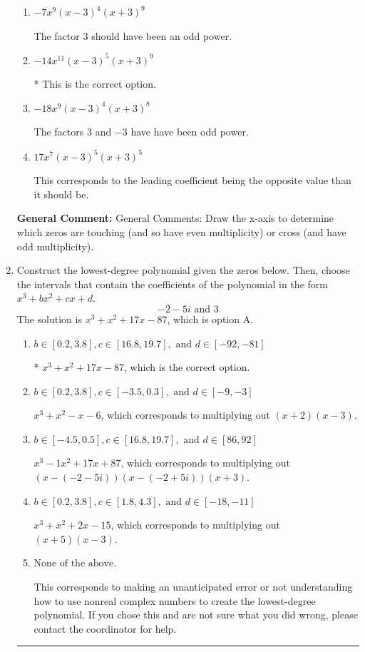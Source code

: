\documentclass{extbook}[14pt]
\newcommand{\litem}[1]{\item #1

\rule{\textwidth}{0.4pt}}
\begin{document}
\begin{enumerate}
{\begin{enumerate}[label=\Alph*.]
The factor $(x - 3)$ should have an odd power and the leading coefficient should be the opposite sign.
\item \( -7x^{9} (x - 3)^{4} (x + 3)^{9} \)

The factor $3$ should have been an odd power.
\item \( -14x^{11} (x - 3)^{5} (x + 3)^{9} \)

* This is the correct option.
\item \( -18x^{9} (x - 3)^{4} (x + 3)^{8} \)

The factors $3$ and $-3$ have have been odd power.
\item \( 17x^{7} (x - 3)^{5} (x + 3)^{5} \)

This corresponds to the leading coefficient being the opposite value than it should be.
\end{enumerate}

\textbf{General Comment:} General Comments: Draw the x-axis to determine which zeros are touching (and so have even multiplicity) or cross (and have odd multiplicity).
}
\litem{
Construct the lowest-degree polynomial given the zeros below. Then, choose the intervals that contain the coefficients of the polynomial in the form $x^3+bx^2+cx+d$.
\[ -2 - 5 i \text{ and } 3 \]The solution is \( x^{3} + x^{2} +17 x -87 \), which is option A.\begin{enumerate}[label=\Alph*.]
\item \( b \in [0.2, 3.8], c \in [16.8, 19.7], \text{ and } d \in [-92, -81] \)

* $x^{3} + x^{2} +17 x -87$, which is the correct option.
\item \( b \in [0.2, 3.8], c \in [-3.5, 0.3], \text{ and } d \in [-9, -3] \)

$x^{3} + x^{2} -x -6$, which corresponds to multiplying out $(x + 2)(x -3)$.
\item \( b \in [-4.5, 0.5], c \in [16.8, 19.7], \text{ and } d \in [86, 92] \)

$x^{3} -1 x^{2} +17 x + 87$, which corresponds to multiplying out $(x-(-2 - 5 i))(x-(-2 + 5 i))(x + 3)$.
\item \( b \in [0.2, 3.8], c \in [1.8, 4.3], \text{ and } d \in [-18, -11] \)

$x^{3} + x^{2} +2 x -15$, which corresponds to multiplying out $(x + 5)(x -3)$.
\item \( \text{None of the above.} \)

This corresponds to making an unanticipated error or not understanding how to use nonreal complex numbers to create the lowest-degree polynomial. If you chose this and are not sure what you did wrong, please contact the coordinator for help.
\end{enumerate}

}
\end{enumerate}
\end{document}
